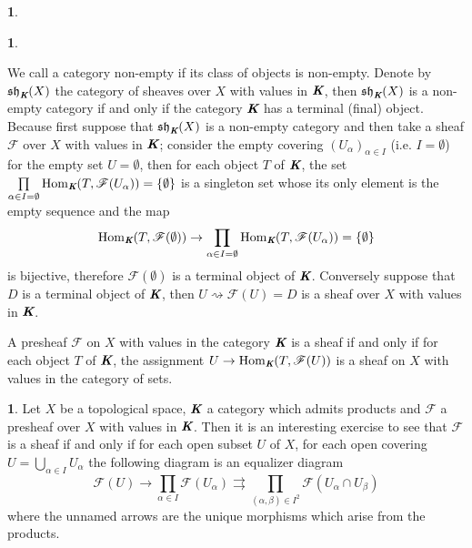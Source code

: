 \documentclass[12pt]{amsart}
\newcommand{\Hom}{\operatorname{Hom}}
\newcommand{\sh}{\operatorname{\mathfrak{sh}}}
\theoremstyle{definition}
\newtheorem{bk}[proposition]{}
\begin{document}
\begin{bk}
\begin{bk}
\end{bk}


We call a category non-empty if its class of objects is non-empty. Denote by $\sh_{\emph{\textbf{K}}}(X)$ the category of sheaves over $X$ with values in $\emph{\textbf{K}}$, then $\sh_{\emph{\textbf{K}}}(X)$ is a non-empty category if and only if the category $\emph{\textbf{K}}$ has a terminal (final) object. Because first suppose that $\sh_{\emph{\textbf{K}}}(X)$ is a non-empty category and then take a sheaf $\mathscr{F}$ over $X$ with values in $\emph{\textbf{K}}$; consider the empty covering $(U_{\alpha})_{\alpha\in I}$ (i.e. $I=\emptyset$) for the empty set $U=\emptyset$, then for each object $T$ of $\emph{\textbf{K}}$, the set $\prod\limits_{\alpha\in I=\emptyset}\Hom_{\emph{\textbf{K}}}(T, \mathscr{F}(U_{\alpha}))=\{\emptyset\}$ is a singleton set whose its only element is the empty sequence and the map $$\Hom_{\emph{\textbf{K}}}(T, \mathscr{F}(\emptyset))\rightarrow\prod\limits_{\alpha\in I=\emptyset}\Hom_{\emph{\textbf{K}}}(T, \mathscr{F}(U_{\alpha}))=\{\emptyset\}$$ is bijective, therefore $\mathscr{F}(\emptyset)$ is a terminal object of $\emph{\textbf{K}}$. Conversely suppose that $D$ is a terminal object of $\emph{\textbf{K}}$, then $U\rightsquigarrow\mathscr{F}(U)=D$ is a sheaf over $X$ with values in $\emph{\textbf{K}}$. 


A presheaf $\mathscr{F}$ on $X$ with values in the category $\emph{\textbf{K}}$ is a sheaf if and only if for each object $T$ of $\emph{\textbf{K}}$, the assignment $U\rightarrow\Hom_{\emph{\textbf{K}}}(T, \mathscr{F}(U))$ is a sheaf on $X$ with values in the category of sets. 

\end{bk}

\begin{bk}\label{tanriverdi} Let $X$ be a topological space, $\emph{\textbf{K}}$ a category which admits products and $\mathscr{F}$ a presheaf over $X$ with values in $\emph{\textbf{K}}$. Then it is an interesting exercise to see that $\mathscr{F}$ is a sheaf if and only if for each open subset $U$ of $X$, for each open covering $U=\bigcup\limits_{\alpha\in I}U_{\alpha}$ the following diagram is an equalizer diagram
$$\mathscr{F}(U)\rightarrow\prod\limits_{\alpha\in I} \mathscr{F}(U_{\alpha})\rightrightarrows\prod\limits_{(\alpha,\beta)\in I^{2}} \mathscr{F}(U_{\alpha}\cap U_{\beta})$$ where the unnamed arrows are the unique morphisms which arise from the products.

\end{bk}
\end{document}

